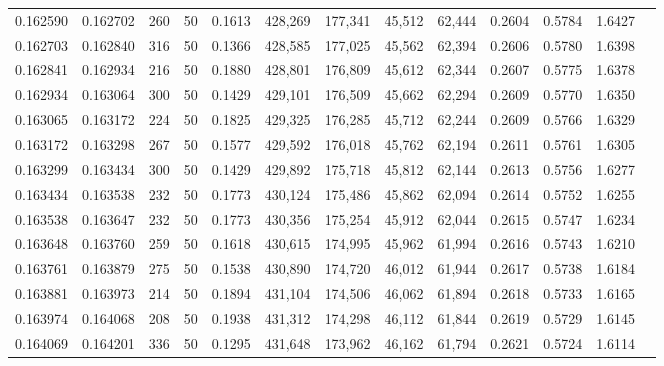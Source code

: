 \begin{tabular}{rrrrrrrrrrrrr}
0.162590 & 0.162702 &   260 &  50 &                                     0.1613 & 428,269 & 177,341 &  45,512 &  62,444 & 0.2604 & 0.5784 & 1.6427 \\
0.162703 & 0.162840 &   316 &  50 &                                     0.1366 & 428,585 & 177,025 &  45,562 &  62,394 & 0.2606 & 0.5780 & 1.6398 \\
0.162841 & 0.162934 &   216 &  50 &                                     0.1880 & 428,801 & 176,809 &  45,612 &  62,344 & 0.2607 & 0.5775 & 1.6378 \\
0.162934 & 0.163064 &   300 &  50 &                                     0.1429 & 429,101 & 176,509 &  45,662 &  62,294 & 0.2609 & 0.5770 & 1.6350 \\
0.163065 & 0.163172 &   224 &  50 &                                     0.1825 & 429,325 & 176,285 &  45,712 &  62,244 & 0.2609 & 0.5766 & 1.6329 \\
0.163172 & 0.163298 &   267 &  50 &                                     0.1577 & 429,592 & 176,018 &  45,762 &  62,194 & 0.2611 & 0.5761 & 1.6305 \\
0.163299 & 0.163434 &   300 &  50 &                                     0.1429 & 429,892 & 175,718 &  45,812 &  62,144 & 0.2613 & 0.5756 & 1.6277 \\
0.163434 & 0.163538 &   232 &  50 &                                     0.1773 & 430,124 & 175,486 &  45,862 &  62,094 & 0.2614 & 0.5752 & 1.6255 \\
0.163538 & 0.163647 &   232 &  50 &                                     0.1773 & 430,356 & 175,254 &  45,912 &  62,044 & 0.2615 & 0.5747 & 1.6234 \\
0.163648 & 0.163760 &   259 &  50 &                                     0.1618 & 430,615 & 174,995 &  45,962 &  61,994 & 0.2616 & 0.5743 & 1.6210 \\
0.163761 & 0.163879 &   275 &  50 &                                     0.1538 & 430,890 & 174,720 &  46,012 &  61,944 & 0.2617 & 0.5738 & 1.6184 \\
0.163881 & 0.163973 &   214 &  50 &                                     0.1894 & 431,104 & 174,506 &  46,062 &  61,894 & 0.2618 & 0.5733 & 1.6165 \\
0.163974 & 0.164068 &   208 &  50 &                                     0.1938 & 431,312 & 174,298 &  46,112 &  61,844 & 0.2619 & 0.5729 & 1.6145 \\
0.164069 & 0.164201 &   336 &  50 &                                     0.1295 & 431,648 & 173,962 &  46,162 &  61,794 & 0.2621 & 0.5724 & 1.6114 \\

\end{tabular}
